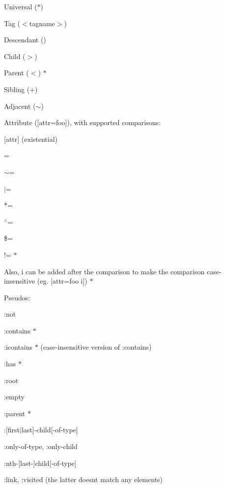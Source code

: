 \begin{DoxyItemize}
\item Universal ({\ttfamily $\ast$})
\item Tag ({\ttfamily $<$tagname$>$})
\item Descendant ()
\item Child ({\ttfamily $>$})
\item Parent ({\ttfamily $<$}) $\ast$
\item Sibling ({\ttfamily +})
\item Adjacent ({\ttfamily $\sim$})
\item Attribute ({\ttfamily \mbox{[}attr=foo\mbox{]}}), with supported comparisons\+:
\begin{DoxyItemize}
\item {\ttfamily \mbox{[}attr\mbox{]}} (existential)
\item {\ttfamily =}
\item {\ttfamily $\sim$=}
\item {\ttfamily $\vert$=}
\item {\ttfamily $\ast$=}
\item {\ttfamily $^\wedge$=}
\item {\ttfamily \$=}
\item {\ttfamily !=} $\ast$
\item Also, {\ttfamily i} can be added after the comparison to make the comparison case-\/insensitive (eg. {\ttfamily \mbox{[}attr=foo i\mbox{]}}) $\ast$
\end{DoxyItemize}
\item Pseudos\+:
\begin{DoxyItemize}
\item {\ttfamily \+:not}
\item {\ttfamily \+:contains} $\ast$
\item {\ttfamily \+:icontains} $\ast$ (case-\/insensitive version of {\ttfamily \+:contains})
\item {\ttfamily \+:has} $\ast$
\item {\ttfamily \+:root}
\item {\ttfamily \+:empty}
\item {\ttfamily \+:parent} $\ast$
\item {\ttfamily \+:\mbox{[}first$\vert$last\mbox{]}-\/child\mbox{[}-\/of-\/type\mbox{]}}
\item {\ttfamily \+:only-\/of-\/type}, {\ttfamily \+:only-\/child}
\item {\ttfamily \+:nth-\/\mbox{[}last-\/\mbox{]}child\mbox{[}-\/of-\/type\mbox{]}}
\item {\ttfamily \+:link}, {\ttfamily \+:visited} (the latter doesn\textquotesingle{}t match any elements)

\end{DoxyItemize}
\end{DoxyItemize}
